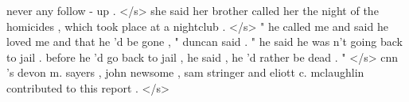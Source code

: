 \documentclass[12pt]{report}
\begin{document}
\begin{appendices}
never any follow - up . </s> she said her brother called her the night of the homicides , which took place at a nightclub . </s> " he called me and said he loved me and that he 'd be gone , " duncan said . " he said he was n't going back to jail . before he 'd go back to jail , he said , he 'd rather be dead . " </s> cnn 's devon m. sayers , john newsome , sam stringer and eliott c. mclaughlin contributed to this report . </s>



\end{appendices}
\end{document}
